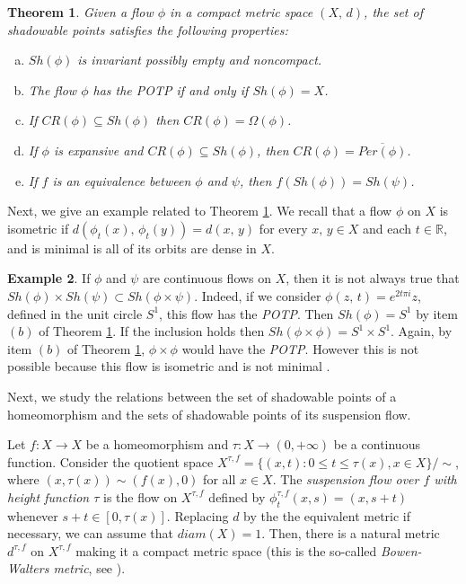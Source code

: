 \documentclass{amsart}
\newtheorem{theorem}{Theorem}[section]
\theoremstyle{definition}
\newtheorem{remark}[theorem]{Remark}
\newtheorem{example}[theorem]{Example}
\begin{document}
\begin{theorem}\label{teo4}
Given a flow $\phi$ in a compact metric space $(X,\, d)$, the set of shadowable points satisfies the following properties:
\begin{enumerate}[(a)]
\item $Sh(\phi)$ is invariant possibly empty and noncompact.
\item The flow $\phi$  has the  POTP if and only if $Sh(\phi) = X$.
\item If $CR(\phi)\subseteq Sh(\phi)$ then $CR(\phi) = \Omega(\phi)$.
\item If $\phi$ is expansive and $CR(\phi)\subseteq Sh(\phi)$, then $CR(\phi)=\overline{Per(\phi)}$.
\item If $f$ is an equivalence between $\phi$ and $\psi$, then $f(Sh(\phi)) = Sh(\psi)$.
\end{enumerate}
\end{theorem}
Next, we give an example related to Theorem \ref{teo4}. We recall that a flow $\phi$ on $X$ is isometric if $d(\phi_t(x),\,\phi_t(y)) = d(x,\,y)$ for every $x,\,y\in X$ and each $t\in \mathbb{R}$, and  is minimal is all of its orbits are dense in $X$.

\begin{example}
If $\phi$ and $\psi$ are continuous flows on $X$, then it is not always true that $Sh(\phi)\times Sh(\psi)\subset Sh(\phi\times \psi)$. Indeed, if we consider  $\phi(z,\,t) = e^{2t\pi i}z$, defined in the unit circle $S^1$, this flow has the {\em POTP}. Then $Sh(\phi)=S^1$ by item $(b)$ of Theorem \ref{teo4}. If the inclusion holds then $Sh(\phi\times \phi)= S^1\times S^1$. Again, by item $(b)$ of Theorem \ref{teo4},  $\phi\times\phi$ would have the {\em POTP}. However  this is not possible because this flow is isometric and is not minimal \cite{Komuro84}. 
\end{example}







Next, we study the relations between the set of shadowable points of a homeomorphism and the sets of shadowable points of its suspension flow.

Let $f:X\to X$ be a homeomorphism and $\tau:X\to(0,+\infty)$ be a continuous function. Consider the quotient space
$X^{\tau,f}=\{(x,t):0\leq t\leq \tau(x), x\in X\}/\sim$, where $(x,\tau(x))\sim(f(x),0)$ for all $x\in X$. The {\em suspension flow over $f$ with height function $\tau$} is the flow on $X^{\tau,f}$ defined by $\phi^{\tau,f}_t(x,s)= (x,s+t)$ whenever $s+t\in [0,\tau(x)]$. Replacing $d$ by the the equivalent metric if necessary, we can assume that $diam(X)=1$. Then, there is a natural metric $d^{\tau,f}$ on $X^{\tau,f}$ making it a compact metric space (this is the so-called {\em Bowen-Walters metric}, see \cite{Bw}).
\end{document}
